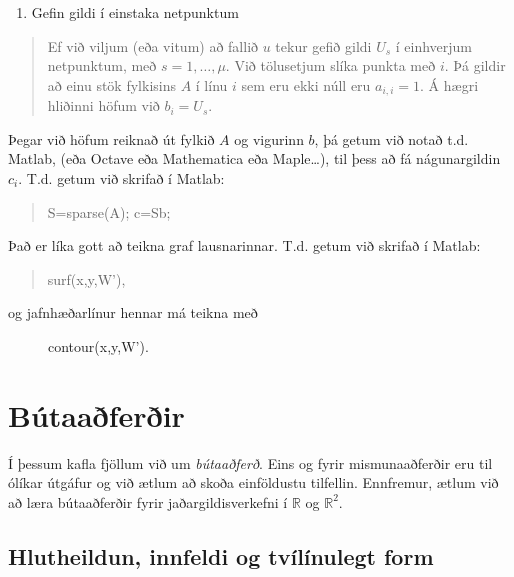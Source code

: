 \documentclass[a4paper,10pt,icelandic]{sphinxmanual}
\begin{document}
\begin{enumerate}
\def\theenumi{\arabic{enumi}}
\def\labelenumi{\theenumi .}
\makeatletter\def\p@enumii{\p@enumi \theenumi .}\makeatother
\setcounter{enumi}{3}
\item {} 
Gefin gildi í einstaka netpunktum

\end{enumerate}
\begin{quote}

Ef við viljum (eða vitum) að fallið \(u\) tekur gefið gildi \(U_s\) í einhverjum netpunktum, með \(s=1, \dots, \mu\). Við tölusetjum slíka punkta með \(i\). Þá gildir að einu stök fylkisins \(A\) í línu \(i\) sem eru ekki núll eru \(a_{i,i}=1\). Á hægri hliðinni höfum við \(b_i=U_s\).
\end{quote}

Þegar við höfum reiknað út fylkið \(A\) og vigurinn \(b\), þá getum við notað t.d. Matlab, (eða Octave eða Mathematica eða Maple…), til þess að fá nágunargildin \(c_i\).
T.d. getum við skrifað í Matlab:
\begin{quote}

S=sparse(A); c=Sb;
\end{quote}

Það er líka gott að teikna graf lausnarinnar.
T.d. getum við skrifað í Matlab:
\begin{quote}

surf(x,y,W’),
\end{quote}
\begin{description}
\item[{og jafnhæðarlínur hennar má teikna með}] \leavevmode
contour(x,y,W’).

\end{description}


\chapter{Bútaaðferðir}
\label{\detokenize{Kafli06:butaaferir}}\label{\detokenize{Kafli06::doc}}
Í þessum kafla fjöllum við um \textit{bútaaðferð}. Eins og fyrir mismunaaðferðir eru til ólíkar útgáfur og við ætlum að skoða einföldustu tilfellin. Ennfremur,  ætlum við að læra bútaaðferðir fyrir jaðargildisverkefni í \(\mathbb R\) og \(\mathbb{R}^2\).


\section{Hlutheildun, innfeldi og tvílínulegt form}
\label{\detokenize{Kafli06:hlutheildun-innfeldi-og-tvilinulegt-form}}
\end{document}
